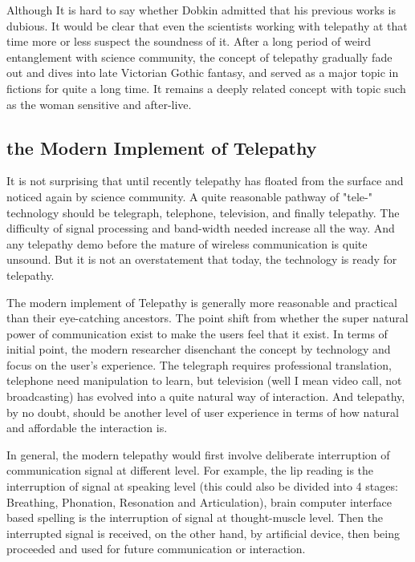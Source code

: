 \documentclass[a4paper]{article}
\begin{document}
Although It is hard to say whether Dobkin admitted that his previous works is dubious. It would be clear that even the scientists working with telepathy at that time more or less suspect the soundness of it. After a long period of weird entanglement with science community, the concept of telepathy gradually fade out  and dives into late Victorian Gothic fantasy, and served as a major topic in fictions for quite a long time.\autocite{luckhurst2002invention} It remains a deeply related concept with topic such as the woman sensitive and after-live.

\subsection{the Modern Implement of Telepathy}

It is not surprising that until recently telepathy has floated from the surface and noticed again by science community. A quite reasonable pathway of "tele-" technology should be telegraph, telephone, television, and finally telepathy. The difficulty of signal processing and band-width needed increase all the way. And any telepathy demo before the mature of wireless communication is quite unsound. But it is not an overstatement that today, the technology is ready for telepathy.

The modern implement of Telepathy is generally more reasonable and practical than their eye-catching ancestors. The point shift from whether the super natural power of communication exist to make the users feel that it exist. In terms of initial point, the modern researcher disenchant the concept by technology and focus on the user's experience. The telegraph requires professional translation, telephone need manipulation to learn, but television (well I mean video call, not broadcasting) has evolved into a quite natural way of interaction. And telepathy, by no doubt, should be another level of user experience in terms of how natural and affordable the interaction is. 

In general, the modern telepathy would first involve deliberate interruption of communication signal at different level. For example, the lip reading is the interruption of signal at speaking level (this could also be divided into 4 stages: Breathing, Phonation, Resonation and Articulation), brain computer interface based spelling is the interruption of signal at thought-muscle level. Then the interrupted signal is received, on the other hand, by artificial device, then being proceeded and used for future communication or interaction.
\end{document}
